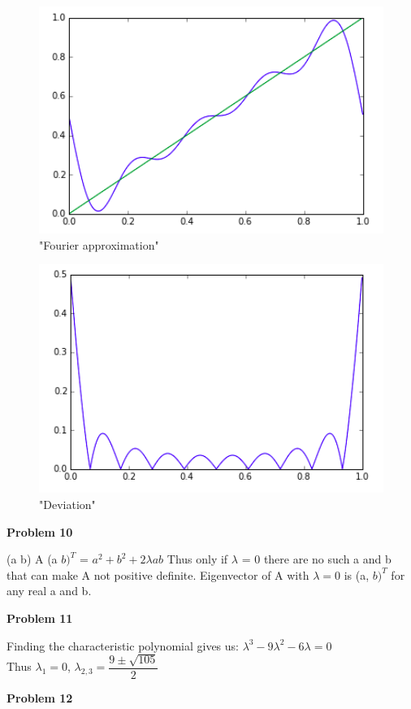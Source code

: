 \documentclass[12pt]{article}
\begin{document}
      \begin{figure}[H]
      	\centering
      	\includegraphics[width=15cm]{3}
      	\caption{"Fourier approximation"}
      \end{figure}
      
      \begin{figure}[H]
      	\centering
      	\includegraphics[width=15cm]{4}
      	\caption{"Deviation"}
      \end{figure}
    
    \textbf{Problem 10}
    
    (a b) A (a $b)^T$ = $a^2 + b^2 + 2 \lambda ab$
    Thus only if $\lambda$ = 0 there are no such a and b that can make A not positive definite.
    Eigenvector of A with $\lambda = 0$ is (a, $b)^T$ for any real a and b. 
    
    \textbf{Problem 11}
    
    Finding the characteristic polynomial gives us: $\lambda^3 - 9 \lambda^2 - 6\lambda = 0$\\
    Thus $\lambda_1 = 0$, $\lambda_{2,3} = \dfrac{9 \pm \sqrt{105}}{2}$
    
    \textbf{Problem 12}
    
\end{document}
